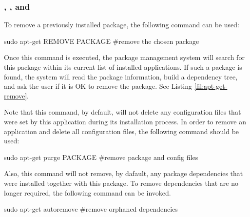 \subsubsection*{, , and }

To remove a previously installed package, the following command can be used:

\begin{command_line}[make]
sudo apt-get REMOVE PACKAGE #remove the chosen package
\end{command_line}

Once this command is executed, the package management system will search for this package within its current list of installed applications. If such a package is found, the system will read the package information, build a dependency tree, and ask the user if it is OK to remove the package. See Listing \ref{fil:apt-get-remove}.


Note that this command, by default, will not delete any configuration files that were set by this application during its installation process. In order to remove an application and delete all configuration files, the following command should be used:
\begin{command_line}[make]
sudo apt-get purge PACKAGE #remove package and config files 
\end{command_line}

Also, this command will not remove, by dafault, any package dependencies that were installed together with this package. To remove dependencies that are no longer required, the following command can be invoked.

\begin{command_line}[make]
sudo apt-get autoremove #remove orphaned dependencies 
\end{command_line}


